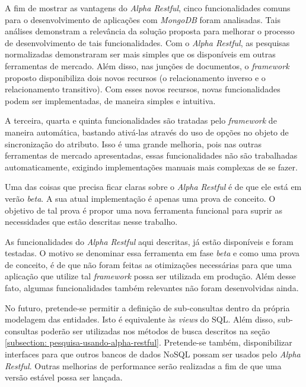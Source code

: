 A fim de mostrar as vantagens do \textit{Alpha Restful}, cinco funcionalidades comuns para o desenvolvimento de aplicações com \textit{MongoDB} foram analisadas. Tais análises demonstram a relevância da solução proposta para melhorar o processo de desenvolvimento de tais funcionalidades. Com o \textit{Alpha Restful}, as pesquisas normalizadas demonstraram ser mais simples que os disponíveis em outras ferramentas de mercado. Além disso, nas junções de documentos, o \textit{framework} proposto disponibiliza dois novos recursos (o relacionamento inverso e o relacionamento transitivo). Com esses novos recursos, novas funcionalidades podem ser implementadas, de maneira simples e intuitiva.

A terceira, quarta e quinta funcionalidades são tratadas pelo \textit{framework} de maneira automática, bastando ativá-las através do uso de opções no objeto de sincronização do atributo. Isso é uma grande melhoria, pois nas outras ferramentas de mercado apresentadas, essas funcionalidades não são trabalhadas automaticamente, exigindo implementações manuais mais complexas de se fazer.

Uma das coisas que precisa ficar claras sobre o \textit{Alpha Restful} é de que ele está em verão \textit{beta}. A sua atual implementação é apenas uma prova de conceito. O objetivo de tal prova é propor uma nova ferramenta funcional para suprir as necessidades que estão descritas nesse trabalho.

As funcionalidades do \textit{Alpha Restful} aqui descritas, já estão disponíveis e foram testadas. O motivo se denominar essa ferramenta em fase \textit{beta} e como uma prova de conceito, é de que não foram feitas as otimizações necessárias para que uma aplicação que utilize tal \textit{framework} possa ser utilizada em produção. Além desse fato, algumas funcionalidades também relevantes não foram desenvolvidas ainda.

No futuro, pretende-se permitir a definição de sub-consultas dentro da própria modelagem das entidades. Isto é equivalente às \textit{views} do SQL. Além disso, sub-consultas poderão ser utilizadas nos métodos de busca descritos na seção \ref{subsection: pesquisa-usando-alpha-restful}. Pretende-se também, disponibilizar interfaces para que outros bancos de dados NoSQL possam ser usados pelo \textit{Alpha Restful}. Outras melhorias de performance serão realizadas a fim de que uma versão estável possa ser lançada.

